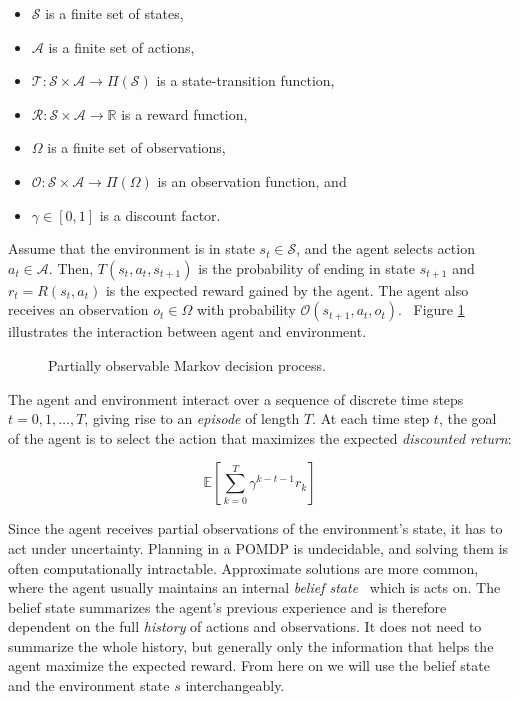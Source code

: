 \begin{itemize}
    \item \(\mathcal{S}\) is a finite set of states,
    \item \(\mathcal{A}\) is a finite set of actions,
    \item \(\mathcal{T}: \mathcal{S} \times \mathcal{A} \rightarrow \Pi(\mathcal{S})\) is a state-transition function,
    \item \(\mathcal{R}: \mathcal{S} \times \mathcal{A} \rightarrow \mathbb{R}\) is a reward function,
    \item \(\Omega\) is a finite set of observations,
    \item \(\mathcal{O}: \mathcal{S} \times \mathcal{A} \rightarrow \Pi(\Omega)\) is an observation function, and
    \item \(\gamma \in [0, 1]\) is a discount factor.
\end{itemize}

Assume that the environment is in state \(s_t \in \mathcal{S}\), and the agent selects action \(a_t \in \mathcal{A}\).
Then, \(T(s_t, a_t, s_{t+1})\) is the probability of ending in state \(s_{t+1}\) and \(r_t = R(s_t, a_t)\) is the expected reward gained by the agent.
The agent also receives an observation \(o_t \in \Omega\) with probability \(\mathcal{O}(s_{t+1}, a_t, o_t)\).~\cite{kaelbling_pomdp_1998}
Figure \ref{fig:pomdp} illustrates the interaction between agent and environment.

\begin{figure}
    \centering
    
    \label{fig:pomdp}
    \caption[Partially observable Markov decision process]{Partially observable Markov decision process.}
\end{figure}

The agent and environment interact over a sequence of discrete time steps \(t = 0, 1, \dots, T\), giving rise to an \textit{episode} of length \(T\).
At each time step \(t\), the goal of the agent is to select the action that maximizes the expected \textit{discounted return}:

\[ 
    \mathbb{E} \left[ \sum_{k=0}^T \gamma^{k-t-1} r_k \right]
\]

Since the agent receives partial observations of the environment's state, it has to act under uncertainty.
Planning in a POMDP is undecidable, and solving them is often computationally intractable.
Approximate solutions are more common, where the agent usually maintains an internal \textit{belief state}~\cite{kaelbling_pomdp_1998} which is acts on.
The belief state summarizes the agent's previous experience and is therefore dependent on the full \textit{history} of actions and observations.
It does not need to summarize the whole history, but generally only the information that helps the agent maximize the expected reward.
From here on we will use the belief state and the environment state \(s\) interchangeably. 


